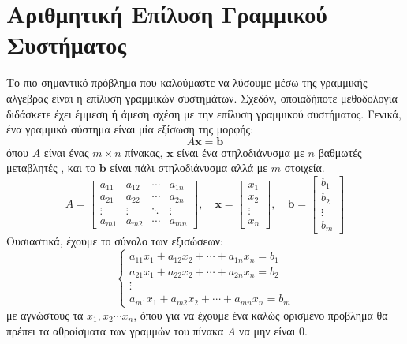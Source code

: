 \chapter{Αριθμητική Επίλυση Γραμμικού Συστήματος}
Το πιο σημαντικό πρόβλημα που καλούμαστε να λύσουμε μέσω της γραμμικής άλγεβρας είναι η επίλυση γραμμικών συστημάτων. Σχεδόν, οποιαδήποτε μεθοδολογία διδάσκετε έχει έμμεση ή άμεση σχέση με την επίλυση γραμμικού συστήματος. Γενικά, ένα γραμμικό σύστημα είναι μία εξίσωση της μορφής:
\begin{equation}
A \mathbf{x}=\mathbf{b}
\label{system_equation}
\end{equation}
όπου $A$ είναι ένας $m \times n$ πίνακας, $\mathbf{x}$ είναι ένα στηλοδιάνυσμα με $n$ βαθμωτές μεταβλητές , και το $\mathbf{b}$ είναι πάλι στηλοδιάνυσμα αλλά με $m$ στοιχεία.
\begin{equation}
A=\left[\begin{array}{cccc}
a_{11} & a_{12} & \cdots & a_{1 n} \\
a_{21} & a_{22} & \cdots & a_{2 n} \\
\vdots & \vdots & \ddots & \vdots \\
a_{m 1} & a_{m 2} & \cdots & a_{m n}
\end{array}\right], \quad \mathbf{x}=\left[\begin{array}{c}
x_1 \\
x_2 \\
\vdots \\
x_n
\end{array}\right], \quad \mathbf{b}=\left[\begin{array}{c}
b_1 \\
b_2 \\
\vdots \\
b_m
\end{array}\right]
\end{equation}
Ουσιαστικά, έχουμε το σύνολο των εξισώσεων:
\begin{equation}
\left\{\begin{array}{l}
a_{11} x_1+a_{12} x_2+\cdots+a_{1 n} x_n=b_1 \\
a_{21} x_1+a_{22} x_2+\cdots+a_{2 n} x_n=b_2 \\
\vdots \\
a_{m 1} x_1+a_{m 2} x_2+\cdots+a_{m n} x_n=b_m
\end{array}\right.
\end{equation}
με αγνώστους τα $x_1,x_2 \cdots x_n$, όπου για να έχουμε ένα καλώς ορισμένο πρόβλημα θα πρέπει τα αθροίσματα των γραμμών του πίνακα $A$ να μην είναι 0.

